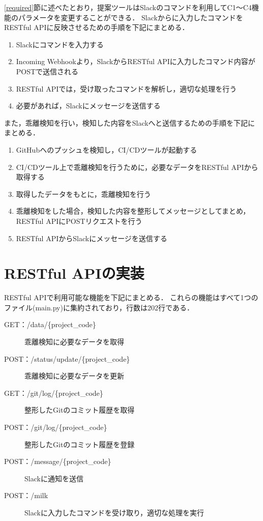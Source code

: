 \ref{required}節に述べたとおり，提案ツールはSlackのコマンドを利用してC1〜C4機能のパラメータを変更することができる．
Slackからに入力したコマンドをRESTful APIに反映させるための手順を下記にまとめる．
\begin{enumerate}
    \item Slackにコマンドを入力する
    \item Incoming Webhookより，SlackからRESTful APIに入力したコマンド内容がPOSTで送信される
    \item RESTful APIでは，受け取ったコマンドを解析し，適切な処理を行う
    \item 必要があれば，Slackにメッセージを送信する
\end{enumerate}

また，乖離検知を行い，検知した内容をSlackへと送信するための手順を下記にまとめる．
\begin{enumerate}
    \item GitHubへのプッシュを検知し，CI/CDツールが起動する
    \item CI/CDツール上で乖離検知を行うために，必要なデータをRESTful APIから取得する
    \item 取得したデータをもとに，乖離検知を行う
    \item 乖離検知をした場合，検知した内容を整形してメッセージとしてまとめ，RESTful APIにPOSTリクエストを行う
    \item RESTful APIからSlackにメッセージを送信する
\end{enumerate}

\section{RESTful APIの実装}
RESTful APIで利用可能な機能を下記にまとめる．
これらの機能はすべて1つのファイル(main.py)に集約されており，行数は202行である．
\begin{description}
    \item[GET：/data/\{project\_code\}] 乖離検知に必要なデータを取得
    \item[POST：/status/update/\{project\_code\}]  乖離検知に必要なデータを更新
    \item[GET：/git/log/\{project\_code\}] 整形したGitのコミット履歴を取得
    \item[POST：/git/log/\{project\_code\}] 整形したGitのコミット履歴を登録
    \item[POST：/message/\{project\_code\}] Slackに通知を送信
    \item[POST：/milk] Slackに入力したコマンドを受け取り，適切な処理を実行
\end{description}

